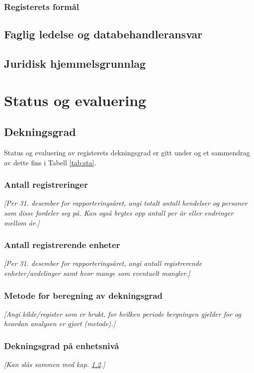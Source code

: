 \documentclass[norsk, a4paper, twocolumn]{report}
\newcommand{\guide}[1] {
	\textit{[\textcolor{guidegray}{#1}]}
	}
\begin{document}
\section{Registerets formål}\label{sec:for}

\chapter{Faglig ledelse og databehandleransvar}\label{cha:led}

\chapter{Juridisk hjemmelsgrunnlag}\label{cha:jur}




\part{Status og evaluering}


\chapter{Dekningsgrad}\label{cha:dek}
Status og evaluering av registerets dekningsgrad er gitt under og et sammendrag
av dette fins i Tabell \ref{tab:sta}.

\section{Antall registreringer}\label{sec:reg}
\guide{Per 31. desember for rapporteringsåret, angi totalt antall
hendelser og personer som disse fordeler seg på. Kan også brytes opp antall
per år eller endringer mellom år.}

\section{Antall registrerende enheter}\label{sec:enh}
\guide{Per 31. desember for rapporteringsåret, angi antall registrerende
enheter/avdelinger samt hvor mange som eventuelt mangler.}
\section{Metode for beregning av dekningsgrad}\label{sec:met}
\guide{Angi kilde/register som er brukt, for hvilken periode bergningen
gjelder for og hvordan analysen er gjort (metode).}
\section{Dekningsgrad på enhetsnivå}\label{sec:endek}
\guide{Kan slås sammen med kap. \ref{sec:enh}.}
\end{document}
